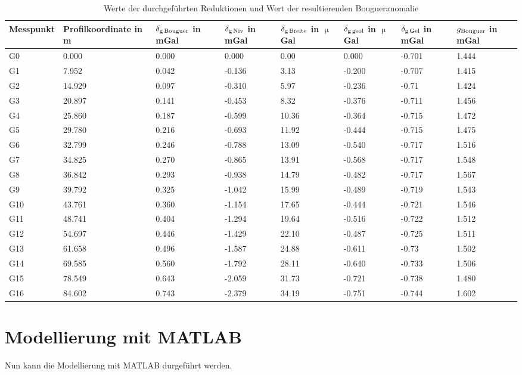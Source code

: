 
\begin{landscape}
\begin{table}[!ht]
\centering
\caption{Werte der durchgeführten Reduktionen und Wert der resultierenden Bougueranomalie}
\label{tab:reduktionen}
\begin{tabular}{llllllll}
\toprule
Messpunkt & Profilkoordinate in m & $\delta_{\mathrm{g\,Bouguer}}$ in mGal & $\delta_{\mathrm{g\,Niv}}$ in mGal & $\delta_{\mathrm{g\,Breite}}$ in $\upmu$Gal & $\delta_{\mathrm{g\,geol}}$ in $\upmu$Gal & $\delta_{\mathrm{g\,Gel}}$ in mGal & $g_{\mathrm{Bouguer}}$ in mGal \\
\midrule
G0 & 0.000 & 0.000 & 0.000 & 0.00 & 0.000 & -0.701 & 1.444 \\
G1 & 7.952 & 0.042 & -0.136 & 3.13 & -0.200 & -0.707 & 1.415 \\
G2 & 14.929 & 0.097 & -0.310 & 5.97 & -0.236 & -0.71 & 1.424 \\
G3 & 20.897 & 0.141 & -0.453 & 8.32 & -0.376 & -0.711 & 1.456 \\
G4 & 25.860 & 0.187 & -0.599 & 10.36 & -0.364 & -0.715 & 1.472 \\
G5 & 29.780 & 0.216 & -0.693 & 11.92 & -0.444 & -0.715 & 1.475 \\
G6 & 32.799 & 0.246 & -0.788 & 13.09 & -0.540 & -0.717 & 1.516 \\
G7 & 34.825 & 0.270 & -0.865 & 13.91 & -0.568 & -0.717 & 1.548 \\
G8 & 36.842 & 0.293 & -0.938 & 14.79 & -0.482 & -0.717 & 1.567 \\
G9 & 39.792 & 0.325 & -1.042 & 15.99 & -0.489 & -0.719 & 1.543 \\
G10 & 43.761 & 0.360 & -1.154 & 17.65 & -0.444 & -0.721 & 1.546 \\
G11 & 48.741 & 0.404 & -1.294 & 19.64 & -0.516 & -0.722 & 1.512 \\
G12 & 54.697 & 0.446 & -1.429 & 22.10 & -0.487 & -0.725 & 1.511 \\
G13 & 61.658 & 0.496 & -1.587 & 24.88 & -0.611 & -0.73 & 1.502 \\
G14 & 69.585 & 0.560 & -1.792 & 28.11 & -0.640 & -0.733 & 1.506 \\
G15 & 78.549 & 0.643 & -2.059 & 31.73 & -0.721 & -0.738 & 1.480 \\
G16 & 84.602 & 0.743 & -2.379 & 34.19 & -0.751 & -0.744 & 1.602 \\ \bottomrule
\end{tabular}
\end{table}
\end{landscape}

\section{Modellierung mit MATLAB}

Nun kann die Modellierung mit MATLAB durgeführt werden.